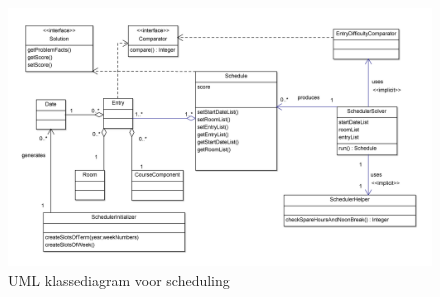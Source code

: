 \begin{landscape}
	\begin{figure}[H]
		\centering
		\includegraphics[scale=0.2]{img/scheduler}
		\caption{UML klassediagram voor scheduling}
		\label{fig:scheduling}
	\end{figure}
\end{landscape}

